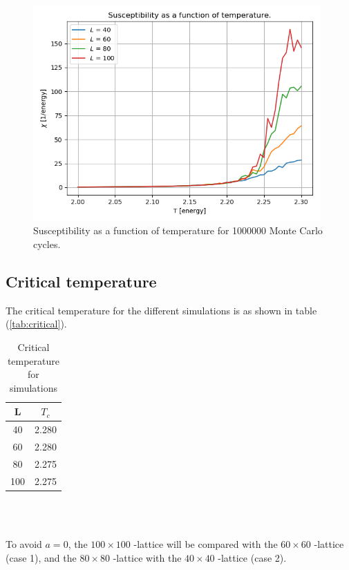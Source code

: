 \documentclass{article}
\begin{document}
  \begin{figure}[ht]
      \centering
      \includegraphics[width = 11cm]{img/tempvssusceptibility2.png}
      \caption{Susceptibility as a function of temperature for 1000000 Monte Carlo cycles.}
      \label{fig:tempvssusceptibility2}
    \end{figure}


\subsection{Critical temperature} \label{sec:criticaltemperature}

  The critical temperature for the different simulations is as shown in table (\ref{tab:critical}).

    \begin{table}[ht]
      \centering
      \caption{Critical temperature for simulations}
      \vspace{2mm}
      \label{tab:critical2}
      \begin{tabular}{|c|c|}
          \hline
           L & $T_c$\\
          \hline \hline
          40 & 2.280 \\
          60 & 2.280 \\
          80 & 2.275 \\
          100 & 2.275 \\
          \hline
      \end{tabular} \\
      \hspace{0pt}\\
    \end{table}

  To avoid $a=0$, the $100 \times 100$ -lattice will be compared with the $60 \times 60$ -lattice (case 1), and the $80 \times 80$ -lattice with the $40 \times 40$ -lattice (case 2). \\
\end{document}
